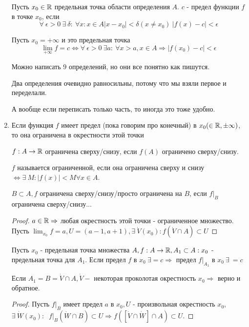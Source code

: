\documentclass[12pt]{report}
\begin{document}
\begin{prop}
\begin{enumerate}
\begin{defn}
Пусть $x_0 \in \mathbb{R}$ предельная точка области определения $A$. $c$ - предел функции $f$ в точке $x_0$, если
$$\forall ~\epsilon > 0 ~\exists ~\delta: ~\forall x : x \in A |x - x_0| < \delta (x \neq x_0) ~|f(x) - c| < \epsilon$$

Пусть $x_0 = +\infty$ и это предельная точка
$$\lim_{+\infty}{f} = c \Leftrightarrow \forall ~\epsilon > 0 ~\exists a: ~\forall x > a, x \in A \Rightarrow |f(x_0) - c| < \epsilon$$

Можно написать $9$ определений, но они все понятно как пишутся.
\end{defn}

\begin{note}
Два определения очевидно равносильны, потому что мы взяли первое и переделали.

А вообще если переписать только часть, то иногда это тоже удобно.
\end{note}

\item
Если функция $f$ имеет предел (пока говорим про конечный) в $x_0 (\in \mathbb{R}, \pm \infty)$, то она ограничена в окрестности этой точки

\begin{defn}
$f: A \to \mathbb{R}$ ограничена сверху/снизу, если $f(A)$ ограничено сверху/снизу.

$f$ называется ограниченной, если она ограничена сверху и снизу $\Leftrightarrow \exists ~M: |f(x)| < M \forall x \in A$.

$B \subset A, f$ ограничена сверху/снизу/просто ограничена на $B$, если $f|_B$ ограничена сверху/снизу...
\end{defn}

\begin{proof}
$a \in \mathbb{R} \Rightarrow$ любая окрестность этой точки - ограниченное множество. Пусть $\lim_{x_0}{f} = a, U = (a - 1, a + 1), \exists ~\dot V(x_0): f(\dot V \cap A) \subset U$
\end{proof}

\begin{st}
Пусть $x_0$ - предельная точка множества $A, f: A \to \mathbb{R}, A_1 \subset A: x_0$ - предельная точка для $A_1$. Если предел $f$ в $x_0 ~\exists = c \Rightarrow$ предел $f|_{A_1}$ в $x_0 ~\exists ~= c$

Если $A_1 = B = \dot V \cap A, \dot V - $ некоторая проколотая окрестность $x_0 \Rightarrow$ верно и обратное.
\end{st}
\begin{proof}
Пусть $f|_B$ имеет предел $a$ в $x_0, U$ - произвольная окрестность $x_0$, $\exists ~\dot W(x_0):$ $~ f|_B(\dot W \cap B) \subset U \Rightarrow f([\dot V \cap \dot W] \cap A) \subset U$.
\end{proof}


\end{enumerate}
\end{prop}
\end{document}

